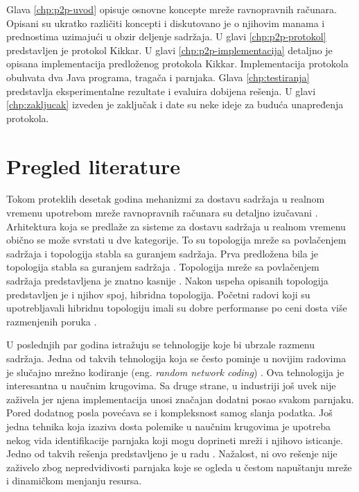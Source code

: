 \documentclass[12pt,oneside]{memoir}
\begin{document}
Glava \ref{chp:p2p-uvod} opisuje osnovne koncepte mreže ravnopravnih računara. Opisani su ukratko različiti koncepti i diskutovano je o njihovim manama i prednostima uzimajući u obzir deljenje sadržaja. U glavi \ref{chp:p2p-protokol} predstavljen je protokol Kikkar. U glavi \ref{chp:p2p-implementacija} detaljno je opisana implementacija predloženog protokola Kikkar. Implementacija protokola obuhvata dva Java programa, tragača i parnjaka. Glava \ref{chp:testiranja} predstavlja eksperimentalne rezultate i evaluira dobijena rešenja. U glavi \ref{chp:zakljucak} izveden je zaključak i date su neke ideje za buduća unapređenja protokola.
 

\section{Pregled literature}
\label{pregled.1}

Tokom proteklih desetak godina mehanizmi za dostavu sadržaja u realnom vremenu upotrebom mreže ravnopravnih računara su detaljno izučavani \cite{Zhang:2012:SPL:2365364.2365643}. Arhitektura koja se predlaže za sisteme za dostavu sadržaja u realnom vremenu obično se može svrstati u dve kategorije. To su topologija mreže sa povlačenjem sadržaja i topologija stabla sa guranjem sadržaja. Prva predložena bila je topologija stabla sa guranjem sadržaja \cite{Venkata}. Topologija mreže sa povlačenjem sadržaja predstavljena je znatno kasnije \cite{ZhangLiu}. Nakon uspeha opisanih topologija predstavljen je i njihov spoj, hibridna topologija. Početni radovi koji su upotrebljavali hibridnu topologiju imali su dobre performanse po ceni dosta više razmenjenih poruka \cite{HAMMAMI2014158}. 

U poslednjih par godina istražuju se tehnologije koje bi ubrzale razmenu sadržaja. Jedna od takvih tehnologija koja se često pominje u novijim radovima je slučajno mrežno kodiranje (eng. \textit{random network coding}) \cite{Nguyen5462032}. Ova tehnologija je interesantna u naučnim krugovima. Sa druge strane, u industriji još uvek nije zaživela jer njena implementacija unosi značajan dodatni posao svakom parnjaku. 
Pored dodatnog posla povećava se i kompleksnost samog slanja podatka. Još jedna tehnika koja izaziva dosta polemike u naučnim krugovima je upotreba nekog vida identifikacije parnjaka koji mogu doprineti mreži i njihovo isticanje. Jedno od takvih rešenja predstavljeno je u radu \cite{Esch6077117}. Nažalost, ni ovo rešenje nije zaživelo zbog nepredvidivosti parnjaka koje se ogleda u čestom napuštanju mreže i dinamičkom menjanju resursa.
\end{document}
